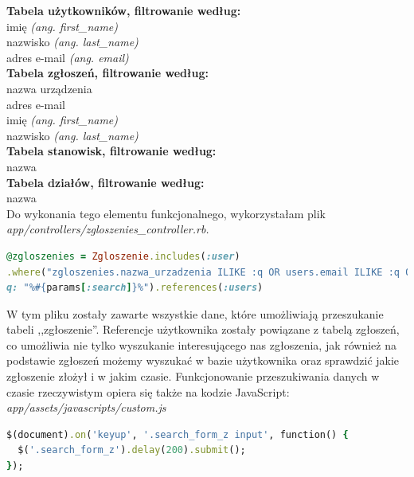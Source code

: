 \documentclass[openright]{xmgr}
\begin{document}
	\textbf{Tabela użytkowników, filtrowanie według:}\\
	\textendash\space imię \textit{(ang. first\_name)}\\
	\textendash\space nazwisko \textit{(ang. last\_name)}\\
	\textendash\space adres e-mail
	\textit{(ang. email)}\\
	
	\textbf{Tabela zgłoszeń, filtrowanie według:}\\
	\textendash\space nazwa urządzenia\\
	\textendash\space adres e-mail\\
	\textendash\space imię
	\textit{(ang. first\_name)}\\
	\textendash\space nazwisko
	\textit{(ang. last\_name)}\\
	
	\textbf{Tabela stanowisk, filtrowanie według:}\\
	\textendash\space nazwa\\
	
	\textbf{Tabela działów, filtrowanie według:}\\
	\textendash\space nazwa\\
	
	Do wykonania tego elementu funkcjonalnego, wykorzystałam plik\\
	\textit{app/controllers/zgloszenies\_controller.rb.}
	
	\begin{lstlisting}[language=Ruby,lineskip={-1pt},caption=Dane według których nastepuje przeszukiwanie]
@zgloszenies = Zgloszenie.includes(:user)
.where("zgloszenies.nazwa_urzadzenia ILIKE :q OR users.email ILIKE :q OR users.first_name ILIKE :q OR users.last_name ILIKE :q", 
q: "%#{params[:search]}%").references(:users)
	\end{lstlisting}
	
	W tym pliku zostały zawarte wszystkie dane, które umożliwiają przeszukanie tabeli ,,zgłoszenie''. Referencje użytkownika zostały powiązane z tabelą zgłoszeń, co umożliwia nie tylko wyszukanie interesującego nas zgłoszenia, jak również na podstawie zgłoszeń możemy wyszukać w bazie użytkownika oraz sprawdzić jakie zgłoszenie złożył i w jakim czasie.
	Funkcjonowanie przeszukiwania danych w czasie rzeczywistym opiera się także na kodzie JavaScript:\\
	
	\textit{app/assets/javascripts/custom.js}
	\begin{lstlisting}[language=Ruby,lineskip={-1pt},caption=JavaScripts - przeszukiwanie w czasie rzeczywistym]
$(document).on('keyup', '.search_form_z input', function() {
  $('.search_form_z').delay(200).submit();
});
	\end{lstlisting}
	
\end{document}
